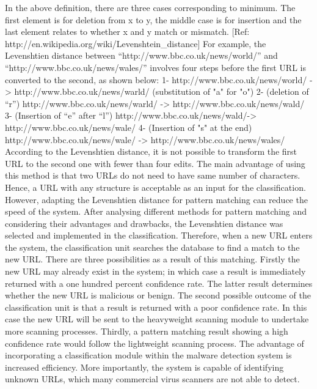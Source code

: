 In the above definition, there are three cases corresponding to minimum. The first element is for deletion from x to y, the middle case is for insertion and the last element relates to whether x and y match or mismatch. [Ref: http://en.wikipedia.org/wiki/Levenshtein_distance] 
For example, the Levenshtien distance between “http://www.bbc.co.uk/news/world/” and “http://www.bbc.co.uk/news/wales/” involves four steps before the first URL is converted to the second, as shown below:
1-	http://www.bbc.co.uk/news/world/ -> http://www.bbc.co.uk/news/warld/ (substitution of "a" for "o")
2-	(deletion of “r”)
http://www.bbc.co.uk/news/warld/ -> http://www.bbc.co.uk/news/wald/
3-	(Insertion of “e” after “l”)
http://www.bbc.co.uk/news/wald/-> http://www.bbc.co.uk/news/wale/
4-	(Insertion of "s" at the end)
http://www.bbc.co.uk/news/wale/ -> http://www.bbc.co.uk/news/wales/
According to the Levenshtien distance, it is not possible to transform the first URL to the second one with fewer than four edits. 
The main advantage of using this method is that two URLs do not need to have same number of characters. Hence, a URL with any structure is acceptable as an input for the classification. However, adapting the Levenshtien distance for pattern matching can reduce the speed of the system.
After analysing different methods for pattern matching and considering their advantages and drawbacks, the Levenshtien distance was selected and implemented in the classification.  Therefore, when a new URL enters the system, the classification unit searches the database to find a match to the new URL. There are three possibilities as a result of this matching. Firstly the new URL may already exist in the system; in which case a result is immediately returned with a one hundred percent confidence rate. The latter result determines whether the new URL is malicious or benign. The second possible outcome of the classification unit is that a result is returned with a poor confidence rate. In this case the new URL will be sent to the heavyweight scanning module to undertake more scanning processes. Thirdly, a pattern matching result showing a high confidence rate would follow the lightweight scanning process.
The advantage of incorporating a classification module within the malware detection system is increased efficiency. More importantly, the system is capable of identifying unknown URLs, which many commercial virus scanners are not able to detect. 
